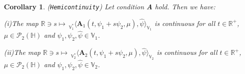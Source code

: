 \documentclass[11pt]{article}
\newtheorem{corollary}[theorem]{Corollary}
\numberwithin{equation}{section}
\begin{document}
\begin{corollary}(\texttt{Hemicontinuity})
\label{cHemicontinuity}
Let condition \textbf{A} hold. Then we have:

(i)The map $\mathbb{R}\ni s\mapsto\
_{\mathbb{V}^*_1}\big\langle \mathbf{A}_1(t,\psi_1+s\psi_2,
\mu  ) ,\widehat{\psi}\big\rangle_{\mathbb{V}_1}$ is
   continuous
 for all $t\in\mathbb{R}^+$,
 $\mu \in \mathcal{P}_2 (\mathbb{H})$ and
  $\psi_1,\psi_2, \widehat{\psi} \in
   \mathbb{V}_1 $.

(ii)The map $\mathbb{R} \ni s\mapsto\
_{\mathbb{V}^*_2}\big\langle \mathbf{A}_2(t,
\psi_1+s\psi_2, \mu ) ,
\widehat{\psi}\big\rangle_{\mathbb{V}_2}$ is
 continuous
 for all $t\in\mathbb{R}^+$,
  $\mu \in \mathcal{P}_2 (\mathbb{H})$ and
  $\psi_1,\psi_2 ,
   \widehat{\psi} \in
    \mathbb{V}_2$.
\end{corollary}
\end{document}
